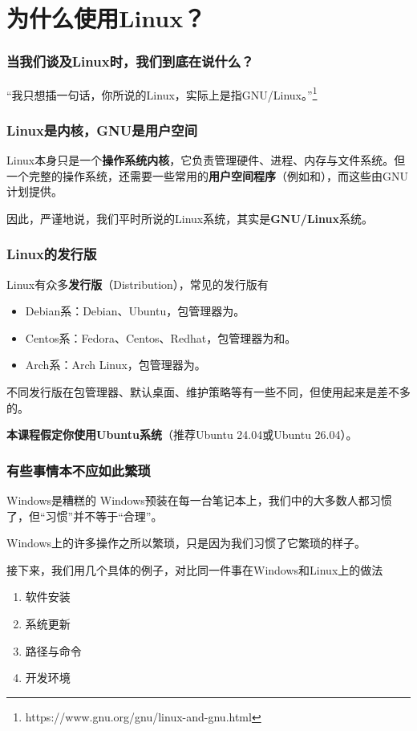 \section{为什么使用Linux？}

\begin{frame}
    \frametitle{当我们谈及Linux时，我们到底在说什么？}
    \begin{center}
        “我只想插一句话，你所说的Linux，实际上是指GNU/Linux。”\footnote{https://www.gnu.org/gnu/linux-and-gnu.html}
    \end{center}
\end{frame}

\begin{frame}
    \frametitle{Linux是内核，GNU是用户空间}
    Linux本身只是一个\textbf{操作系统内核}，它负责管理硬件、进程、内存与文件系统。但一个完整的操作系统，还需要一些常用的\textbf{用户空间程序}（例如和），而这些由GNU计划提供。

    因此，严谨地说，我们平时所说的Linux系统，其实是\textbf{GNU/Linux}系统。
\end{frame}

\begin{frame}
    \frametitle{Linux的发行版}
    Linux有众多\textbf{发行版}（Distribution），常见的发行版有
    \begin{itemize}
        \item Debian系：Debian、Ubuntu，包管理器为。
        \item Centos系：Fedora、Centos、Redhat，包管理器为和。
        \item Arch系：Arch Linux，包管理器为。
    \end{itemize}
    不同发行版在包管理器、默认桌面、维护策略等有一些不同，但使用起来是差不多的。

    \textbf{本课程假定你使用Ubuntu系统}（推荐Ubuntu 24.04或Ubuntu 26.04）。
\end{frame}

\begin{frame}
    \frametitle{有些事情本不应如此繁琐}
    \begin{vspquote}{Windows是糟糕的}
        Windows预装在每一台笔记本上，我们中的大多数人都习惯了，但“习惯”并不等于“合理”。
        
        Windows上的许多操作之所以繁琐，只是因为我们习惯了它繁琐的样子。
    \end{vspquote}
    接下来，我们用几个具体的例子，对比同一件事在Windows和Linux上的做法
    \begin{enumerate}
        \item 软件安装
        \item 系统更新
        \item 路径与命令
        \item 开发环境
    \end{enumerate}
\end{frame}

